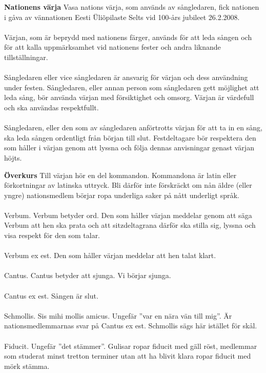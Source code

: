 \begin{intersong}
\flushleft\textbf{Nationens värja}
Vasa nations värja, som används av sångledaren, fick nationen i gåva av vännationen Eesti Üli\~{o}pilaste Selts vid 100-års jubileet 26.2.2008. 
\\
~\\
Värjan, som är beprydd med nationens färger, används för att leda sången och för att kalla uppmärksamhet vid nationens fester och andra liknande tillställningar.
\\
~\\
Sångledaren eller vice sångledaren är ansvarig för värjan och dess användning under festen. Sångledaren, eller annan person som sångledaren gett möjlighet att leda sång, bör använda värjan med försiktighet och omsorg. Värjan är värdefull och ska användas respektfullt. 
\\
~\\
Sångledaren, eller den som av sångledaren anförtrotts värjan för att ta in en sång, ska leda sången ordentligt från början till slut. Festdeltagare bör respektera den som håller i värjan genom att lyssna och följa dennas anvisningar genast värjan höjts.

\flushleft\textbf{Överkurs}
Till värjan hör en del kommandon. Kommandona är latin eller förkortningar av latinska uttryck. Bli därför inte förskräckt om nån äldre (eller yngre) nationsmedlem börjar ropa underliga saker på nått underligt språk. 
\\
~\\
Verbum. Verbum betyder ord. Den som håller värjan meddelar genom att säga Verbum att hen ska prata och att sitzdeltagrana därför ska stilla sig, lyssna och visa respekt för den som talar.
\\
~\\
Verbum ex est. Den som håller värjan meddelar att hen talat klart.
\\
~\\
Cantus.  Cantus betyder att sjunga. Vi börjar sjunga.
\\
~\\
Cantus ex est. Sången är slut.
\\
~\\
Schmollis. Sis mihi mollis amicus. Ungefär ”var en nära vän till mig”. Är nationsmedlemmarnas svar på Cantus ex est. Schmollis sägs här istället för skål.  
\\
~\\
Fiducit. Ungefär ”det stämmer”. Gulisar ropar fiducit med gäll röst, medlemmar som studerat minst tretton terminer utan att ha blivit klara ropar fiducit med mörk stämma.

\end{intersong}